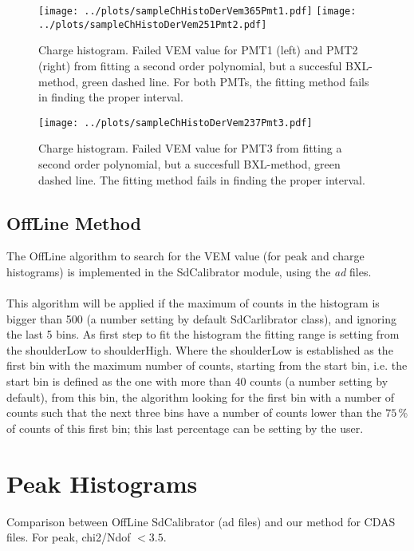 \documentclass[twoside, final, 10pt]{articleMine}
\begin{document}
\begin{figure}[!tbh]
  \centering
  \subfigure
  {
    \texttt{[image: ../plots/sampleChHistoDerVem365Pmt1.pdf]}
    \texttt{[image: ../plots/sampleChHistoDerVem251Pmt2.pdf]}
  }
  \caption{Charge histogram. Failed VEM value for PMT1 (left) and
  PMT2 (right) from fitting a second order polynomial, but a
  succesful BXL-method, green dashed line. For both PMTs, the
  fitting method fails in finding the proper interval.}
  \label{figChSampleFailFitGoodDerpmt12}
\end{figure}

\begin{figure}[!tbh]
  \centering
  \subfigure
  {
    \texttt{[image: ../plots/sampleChHistoDerVem237Pmt3.pdf]}
  }
  \caption{Charge histogram. Failed VEM value for PMT3 from
  fitting a second order polynomial, but a succesfull BXL-method,
  green dashed line. The fitting method fails in finding the
  proper interval.}
  \label{figChSampleFailFitGoodDerpmt3}
\end{figure}
\clearpage


\subsection*{OffLine Method}
The OffLine algorithm to search for the VEM value (for peak and
charge histograms) is implemented in the SdCalibrator module,
using the {\it ad} files.\\\\This algorithm will be applied if
the maximum of counts in the histogram is bigger than 500 (a
number setting by default SdCarlibrator class), and ignoring the
last 5 bins. As first step to fit the histogram the fitting range
is setting from the shoulderLow to shoulderHigh. Where the
shoulderLow is established as the first bin with the maximum
number of counts, starting from the start bin, i.e. the start bin
is defined as the one with more than 40 counts (a number setting
by default), from this bin, the algorithm looking for the first
bin with a number of counts such that the next three bins have a
number of counts lower than the $75$\,\% of counts of this first
bin; this last percentage can be setting by the user.
\clearpage

\section*{Peak Histograms}
Comparison between OffLine SdCalibrator (ad files) and our method
for CDAS files. For peak, chi2/Ndof $<3.5$.
\end{document}

